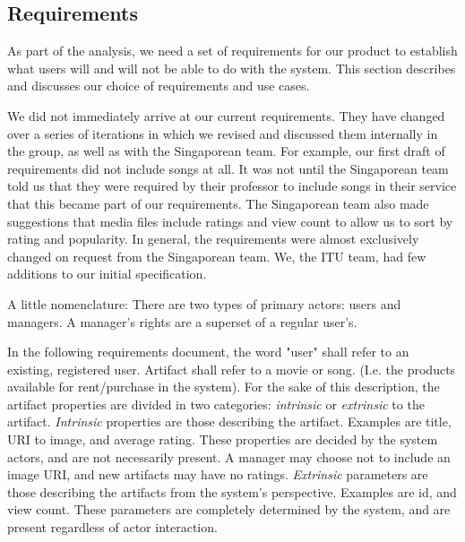 \subsection{Requirements}
As part of the analysis, we need a set of requirements for our product to
establish what users will and will not be able to do with the system. This
section describes and discusses our choice of requirements and use cases.

We did not immediately arrive at our current requirements. They have changed
over a series of iterations in which we revised and discussed them internally in
the group, as well as with the Singaporean team. For example, our first draft of
requirements did not include songs at all. It was not until the Singaporean team
told us that they were required by their professor to include songs in their
service that this became part of our requirements. The Singaporean team also
made suggestions that media files include ratings and view count to allow us to
sort by rating and popularity. In general, the requirements were almost
exclusively changed on request from the Singaporean team. We, the ITU team,
had few additions to our initial specification.

\label{sec:requirements}
A little nomenclature:
There are two types of primary actors: users and managers. A manager’s rights
are a superset of a regular user's. 

In the following requirements document, the word "user" shall refer to an
existing, registered user. Artifact shall refer to a movie or song. (I.e. the
products available for rent/purchase in the system). For the sake of this
description, the artifact properties are divided in two categories:
\emph{intrinsic} or \emph{extrinsic} to the artifact. \emph{Intrinsic}
properties are those describing the artifact. Examples are title, URI to image,
and average rating. These properties are decided by the system actors, and are
not necessarily present. A manager may choose not to include an image URI, and
new artifacts may have no ratings. \emph{Extrinsic} parameters are those
describing the artifacts from the system's perspective. Examples are id, and
view count. These parameters are completely determined by the system, and are
present regardless of actor interaction.

